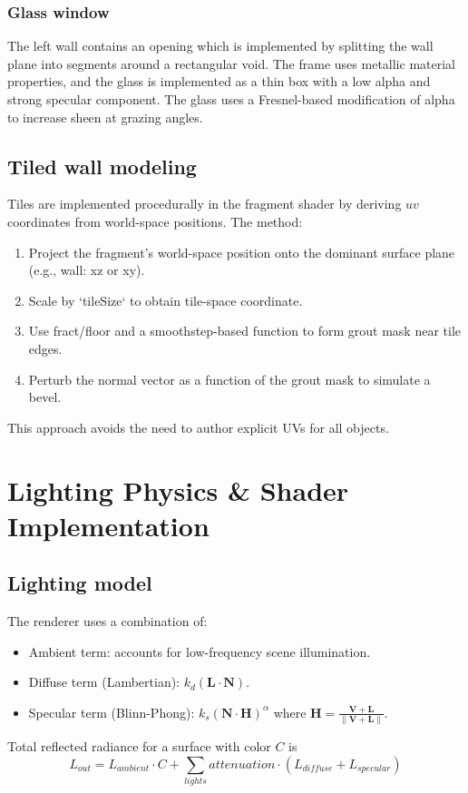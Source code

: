 \documentclass[12pt,a4paper]{report}
\begin{document}
\subsection{Glass window}
The left wall contains an opening which is implemented by splitting the wall plane into segments around a rectangular void. The frame uses metallic material properties, and the glass is implemented as a thin box with a low alpha and strong specular component. The glass uses a Fresnel-based modification of alpha to increase sheen at grazing angles.

\section{Tiled wall modeling}
Tiles are implemented procedurally in the fragment shader by deriving \(uv\) coordinates from world-space positions. The method:
\begin{enumerate}
  \item Project the fragment's world-space position onto the dominant surface plane (e.g., wall: xz or xy).
  \item Scale by `tileSize` to obtain tile-space coordinate.
  \item Use fract/floor and a smoothstep-based function to form grout mask near tile edges.
  \item Perturb the normal vector as a function of the grout mask to simulate a bevel.
\end{enumerate}
This approach avoids the need to author explicit UVs for all objects.

\chapter{Lighting Physics \& Shader Implementation}

\section{Lighting model}
The renderer uses a combination of:
\begin{itemize}
  \item Ambient term: accounts for low-frequency scene illumination.
  \item Diffuse term (Lambertian): \(k_d (\mathbf{L}\cdot\mathbf{N})\).
  \item Specular term (Blinn-Phong): \(k_s (\mathbf{N}\cdot\mathbf{H})^{\alpha}\) where \( \mathbf{H} = \frac{\mathbf{V}+\mathbf{L}}{\|\mathbf{V}+\mathbf{L}\|}\).
\end{itemize}
Total reflected radiance for a surface with color \(C\) is
\[
  L_{out} = L_{ambient} \cdot C + \sum_{lights} attenuation \cdot (L_{diffuse} + L_{specular})
\]
\end{document}
